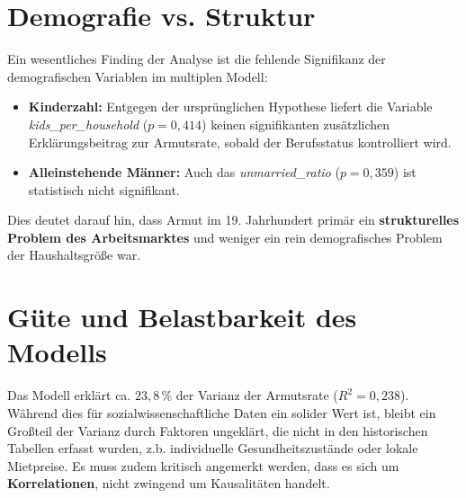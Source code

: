 \section*{Demografie vs. Struktur}
Ein wesentliches Finding der Analyse ist die fehlende Signifikanz der demografischen Variablen im multiplen Modell:
\begin{itemize}
    \item \textbf{Kinderzahl:} Entgegen der ursprünglichen Hypothese liefert die Variable \textit{kids\_per\_household} ($p = 0,414$) keinen signifikanten zusätzlichen Erklärungsbeitrag zur Armutsrate, sobald der Berufsstatus kontrolliert wird.
    \item \textbf{Alleinstehende Männer:} Auch das \textit{unmarried\_ratio} ($p = 0,359$) ist statistisch nicht signifikant.
\end{itemize}
Dies deutet darauf hin, dass Armut im 19. Jahrhundert primär ein \textbf{strukturelles Problem des Arbeitsmarktes} und weniger ein rein demografisches Problem der Haushaltsgröße war.

\section*{Güte und Belastbarkeit des Modells}
Das Modell erklärt ca. $23,8\,\%$ der Varianz der Armutsrate ($R^{2} = 0,238$). Während dies für sozialwissenschaftliche Daten ein solider Wert ist, bleibt ein Großteil der Varianz durch Faktoren ungeklärt, die nicht in den historischen Tabellen erfasst wurden, z.b. individuelle Gesundheitszustände oder lokale Mietpreise. Es muss zudem kritisch angemerkt werden, dass es sich um \textbf{Korrelationen}, nicht zwingend um Kausalitäten handelt. 
